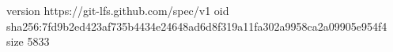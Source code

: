 version https://git-lfs.github.com/spec/v1
oid sha256:7fd9b2ed423af735b4434e24648ad6d8f319a11fa302a9958ca2a09905e954f4
size 5833
